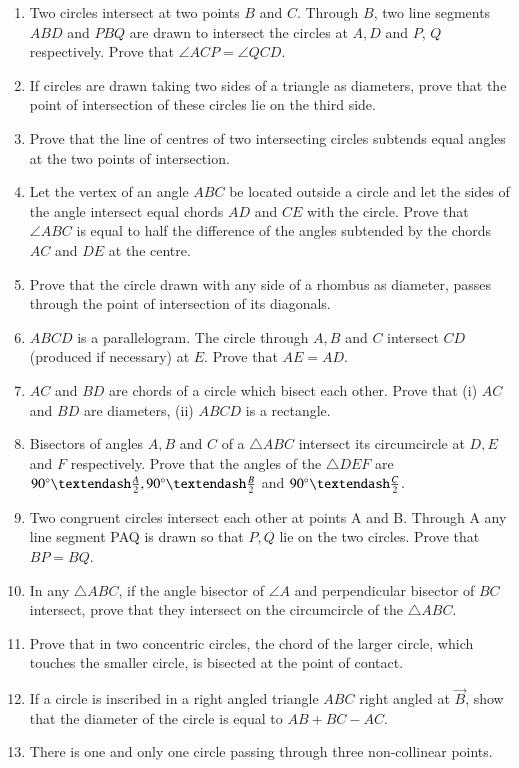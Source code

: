 \begin{enumerate}[label=\thesubsection.\arabic*,ref=\thesubsection.\theenumi]
\item Two circles intersect at two points $B$ and $C$.
Through $B$, two line segments $ABD$ and $PBQ$
are drawn to intersect the circles at $A, D$ and $P$,
$Q$ respectively. Prove that
$\angle ACP = \angle QCD$.
\item If circles are drawn taking two sides of a triangle as diameters, prove that the point of
intersection of these circles lie on the third side.
\item Prove that the line of centres of two intersecting circles subtends equal angles at the
two points of intersection.
\item Let the vertex of an angle $ABC$ be located outside a circle and let the sides of the angle
intersect equal chords $AD$ and $CE$ with the circle. Prove that $\angle ABC$ is equal to half the
difference of the angles subtended by the chords $AC$ and $DE$ at the centre.
\item Prove that the circle drawn with any side of a rhombus as diameter, passes through
the point of intersection of its diagonals.
\item $ABCD$ is a parallelogram. The circle through $A, B$ and $C$ intersect $CD$ (produced if
necessary) at $E$. Prove that $AE = AD$.
\item $AC$ and $BD$ are chords of a circle which bisect each other. Prove that (i) $AC$ and $BD$ are
diameters, (ii) $ABCD$ is a rectangle.
\item Bisectors of angles $A, B$ and $C$ of a $\triangle ABC$ intersect its circumcircle at $D, E$ and
$F$ respectively. Prove that the angles of the $\triangle DEF$ are $90\degree – \frac{A}{2}, 90\degree – \frac{B}{2}$ and $90\degree – \frac{C}{2}$.
\item Two congruent circles intersect each other at points A and B. Through A any line segment PAQ is drawn so that $P, Q$ lie on the two circles. Prove that $BP = BQ$.
\item In any $\triangle ABC$, if the angle bisector of $\angle A$ and perpendicular bisector of $BC$ intersect, prove that they intersect on the circumcircle of the $\triangle ABC$.
%
%
\item Prove that in two concentric circles, the chord of the larger circle, which touches the smaller circle, is bisected at the point of contact.
%
%
%
     	\item If a circle is inscribed in a right angled triangle $ABC$ right angled at $\vec{B}$, show that the diameter of the circle is equal to $AB+BC-AC$.
\item  There is one and only one circle passing through three non-collinear points. 

\end{enumerate}
